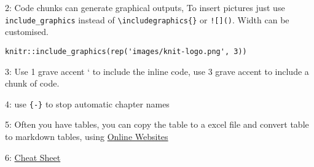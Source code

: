 \documentclass[
]{book}
\begin{document}
2: Code chunks can generate graphical outputs, To insert pictures just use \texttt{include\_graphics} instead of \texttt{\textbackslash{}includegraphics\{\}} or \texttt{!{[}{]}()}. Width can be customised.

\begin{verbatim}
knitr::include_graphics(rep('images/knit-logo.png', 3))
\end{verbatim}

3: Use 1 grave accent ` to include the inline code, use 3 grave accent to include a chunk of code.

4: use \texttt{\{-\}} to stop automatic chapter names

5: Often you have tables, you can copy the table to a excel file and convert table to markdown tables, using \href{https://www.tablesgenerator.com/markdown_tables}{Online Websites}

6: \href{https://www.rstudio.com/wp-content/uploads/2015/02/rmarkdown-cheatsheet.pdf}{Cheat Sheet}

  
\end{document}
